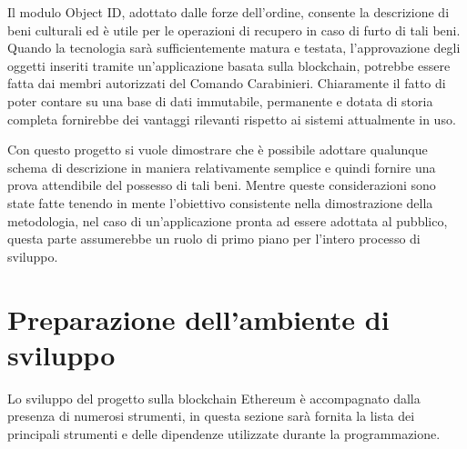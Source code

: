 Il modulo Object ID, adottato dalle forze dell'ordine, consente la descrizione di beni culturali ed è utile per le operazioni di recupero in caso di furto di tali beni. Quando la tecnologia sarà sufficientemente matura e testata, l'approvazione degli oggetti inseriti tramite un'applicazione basata sulla blockchain, potrebbe essere fatta dai membri autorizzati del Comando Carabinieri. Chiaramente il fatto di poter contare su una base di dati immutabile, permanente e dotata di storia completa fornirebbe dei vantaggi rilevanti rispetto ai sistemi attualmente in uso.

Con questo progetto si vuole dimostrare che è possibile adottare qualunque schema di descrizione in maniera relativamente semplice e quindi fornire una prova attendibile del possesso di tali beni. Mentre queste considerazioni sono state fatte tenendo in mente l'obiettivo consistente nella dimostrazione della metodologia, nel caso di un’applicazione pronta ad essere adottata al pubblico, questa parte assumerebbe un ruolo di primo piano per l'intero processo di sviluppo.

\section{Preparazione dell'ambiente di sviluppo}

Lo sviluppo del progetto sulla blockchain Ethereum è accompagnato dalla presenza di numerosi strumenti, in questa sezione sarà fornita la lista dei principali strumenti e delle dipendenze utilizzate durante la programmazione.

